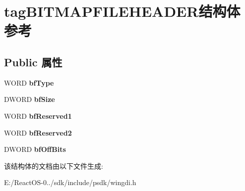 \hypertarget{structtag_b_i_t_m_a_p_f_i_l_e_h_e_a_d_e_r}{}\section{tag\+B\+I\+T\+M\+A\+P\+F\+I\+L\+E\+H\+E\+A\+D\+E\+R结构体 参考}
\label{structtag_b_i_t_m_a_p_f_i_l_e_h_e_a_d_e_r}
\subsection*{Public 属性}
\begin{DoxyCompactItemize}
\item 
\mbox{\label{structtag_b_i_t_m_a_p_f_i_l_e_h_e_a_d_e_r_a64ced0b35fb93012ce3d66b2f1dd5bb8}} 
W\+O\+RD {\bfseries bf\+Type}
\item 
\mbox{\label{structtag_b_i_t_m_a_p_f_i_l_e_h_e_a_d_e_r_ad6fa0d3a907934d597b2773bc45e4d43}} 
D\+W\+O\+RD {\bfseries bf\+Size}
\item 
\mbox{\label{structtag_b_i_t_m_a_p_f_i_l_e_h_e_a_d_e_r_aee794445cde1ce265644c1718afc6b52}} 
W\+O\+RD {\bfseries bf\+Reserved1}
\item 
\mbox{\label{structtag_b_i_t_m_a_p_f_i_l_e_h_e_a_d_e_r_a017d814d24a7c65de297be31856501dc}} 
W\+O\+RD {\bfseries bf\+Reserved2}
\item 
\mbox{\label{structtag_b_i_t_m_a_p_f_i_l_e_h_e_a_d_e_r_a5740a971a88afb51b014f54d9eb1c95c}} 
D\+W\+O\+RD {\bfseries bf\+Off\+Bits}
\end{DoxyCompactItemize}


该结构体的文档由以下文件生成\+:\begin{DoxyCompactItemize}
\item 
E\+:/\+React\+O\+S-\/0../sdk/include/psdk/wingdi.\+h\end{DoxyCompactItemize}
